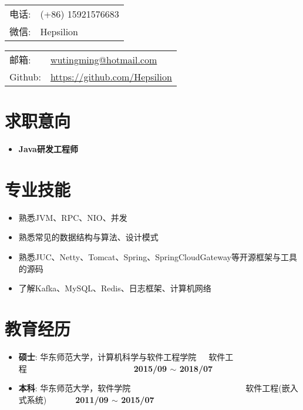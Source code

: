 \documentclass[letterpaper, UTF8, 11pt]{article}
\def\name{\textbf{\textcolor[rgb]{0.00, 0.00, 0.00}{\fontsize{30pt}{30pt}吴庭明}} ~~~~~~~~~ \fontsize{15pt}{15pt}}
\begin{document}
	
	\noindent{\bf \name} 
	\vspace{0.1in}

	\begin{minipage}{0.45\linewidth}
		\begin{tabular}{ll}
			电话:   & (+86) 15921576683 \\
			微信:   & Hepsilion \\
		\end{tabular}
	\end{minipage}
	\begin{minipage}{0.45\linewidth}
		\begin{tabular}{ll}
			邮箱:   & \href{mailto:wutingming@hotmail.com}{ wutingming@hotmail.com} \\
			Github: & \href{https://github.com/Hepsilion}{https://github.com/Hepsilion}\\
		\end{tabular}
	\end{minipage}
	\vspace{-0.1in}
	
	\section*{\textbf{求职意向}}\vspace{-0.12in}
	\begin{itemize}
		\item \textbf{Java研发工程师}
	\end{itemize}
	\vspace{-0.25in}
	
	\section*{\textbf{专业技能}}\vspace{-0.12in}
	\begin{itemize}
		\item 熟悉JVM、RPC、NIO、并发
		\item 熟悉常见的数据结构与算法、设计模式
		\item 熟悉JUC、Netty、Tomcat、Spring、SpringCloudGateway等开源框架与工具的源码
		\item 了解Kafka、MySQL、Redis、日志框架、计算机网络

	\end{itemize}
	\vspace{-0.32in}
	
	\section*{\textbf{教育经历}}\vspace{-0.12in}
	\begin{itemize}
		\item \textbf{硕士}: 华东师范大学，计算机科学与软件工程学院~~~软件工程~~~~~~~~~~~~~~~~~~~~~~~~~~\textbf{2015/09 $\sim$ 2018/07}
		\item \textbf{本科}: 华东师范大学，软件学院~~~~~~~~~~~~~~~~~~~~~~~~~~~~软件工程(嵌入式系统)~~~~~~~\textbf{2011/09 $\sim$ 2015/07}
	\end{itemize}
	\vspace{-0.32in}
	
\end{document}
